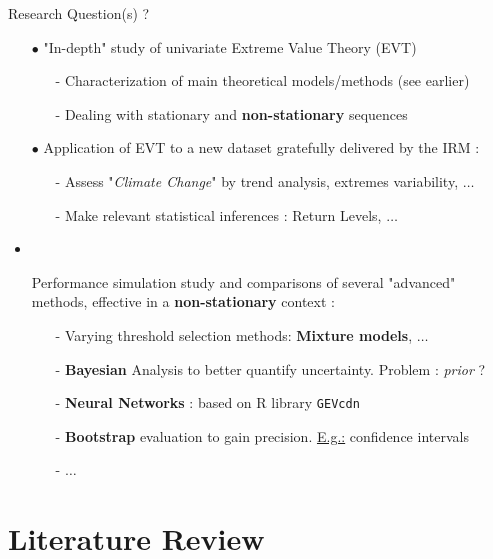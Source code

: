 \documentclass[9pt,xcolor={dvipsnames}]{beamer}
\begin{document}
\begin{frame}
\begin{columns}[T]
\end{columns}
\end{frame}


\begin{frame}{Research Question(s) ?}
\begin{itemize}
\item[$\bullet$] "In-depth" study of univariate Extreme Value Theory (EVT)
\begin{itemize}
	\item[-] Characterization of main theoretical models/methods (see earlier)
	\item[-] Dealing with stationary and \textbf{non-stationary} sequences
\end{itemize}
\item[$\bullet$] Application of EVT to a new dataset gratefully delivered by the IRM : 
\begin{itemize}
	\item[-] Assess "\emph{Climate Change}" by trend analysis, extremes variability, $\dots$
	\item[-] Make relevant statistical inferences : Return Levels, $\dots$
\end{itemize}
\item\item[{\fontfamily{cyklop}\fontsize{6.5}{7}\selectfont \boxed{\textit{?}}}] Performance simulation study and comparisons of several "advanced" methods, effective in a \textbf{non-stationary} context : 
\begin{itemize}
	\item[-] Varying threshold selection methods:  \textbf{Mixture models}, $\dots$
	\item[-] \textbf{Bayesian} Analysis to better quantify uncertainty. Problem : \emph{prior} ?
	\item[-] \textbf{Neural Networks} : based on R library \texttt{GEVcdn}
	\item[-] \textbf{Bootstrap} evaluation to gain precision. \underline{E.g.:} confidence intervals
	\item[-] $\dots$
\end{itemize}

\end{itemize}
\end{frame}


\section{Literature Review}
\end{document}
